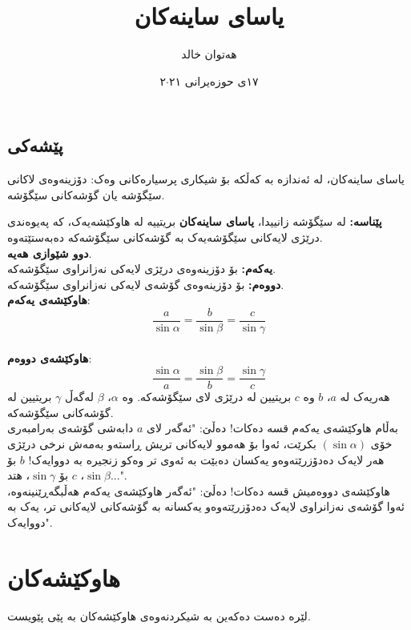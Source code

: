 \documentclass[a4paper,12pt]{article}
\author{هەتوان خالد}
\title{\textbf{یاسای ساینەکان}}
\date{١٧ی حوزەیرانی ٢١$\cdot$٢}
\begin{document}
\tableofcontents
\maketitle
\begin{center}
\begin{flushright}
\section{پێشەکی}
\end{flushright}
یاسای ساینەکان، لە ئەندازە بە کەڵکە بۆ شیکاری پرسیارەکانی وەک: دۆزینەوەی لاکانی سێگۆشە یان گۆشەکانی سێگۆشە.
\end{center}
\textbf{پێناسە:} لە سێگۆشە زانییدا، \textbf{یاسای ساینەکان} بریتییە لە هاوکێشەیەک، کە پەیوەندی درێژی لایەکانی سێگۆشەیەک بە گۆشەکانی سێگۆشەکە دەبەستێتەوە.\\

\textbf{{\large دوو شێوازی هەیە}}.\\

\textbf{یەکەم:} بۆ دۆزینەوەی درێژی لایەکی نەزانراوی سێگۆشەکە.\\

\textbf{دووەم:} بۆ دۆزینەوەی گۆشەی لایەکی نەزانراوی سێگۆشەکە.\\


\textbf{هاوکێشەی یەکەم}:$$\frac{a}{\sin \alpha}=\frac{b}{\sin \beta}=\frac{c}{\sin \gamma}$$\\


\textbf{هاوکێشەی دووەم}:$$\frac{\sin \alpha}{a}=\frac{\sin \beta}{b}=\frac{\sin \gamma}{c}$$
 هەریەک لە $a$، $b$ وە $c$ بریتیین لە درێژی لای سێگۆشەکە. وە $\alpha$، $\beta$ لەگەڵ $\gamma$ بریتیین لە گۆشەکانی
 سێگۆشەکە.\\
 
 
 بەڵام هاوکێشەی یەکەم قسە دەکات! دەڵێ: "ئەگەر لای $a$ دابەشی گۆشەی بەرامبەری خۆی $(\sin \alpha)$ بکرێت، ئەوا بۆ هەموو لایەکانی تریش ڕاستەو بەمەش نرخی درێژی هەر لایەک  دەدۆزرێتەوەو یەکسان دەبێت بە ئەوی تر وەکو زنجیرە بە دووایەک! $b$ بۆ $\sin \beta$، $c$ بۆ $\sin \gamma$، هتد...".\\
هاوکێشەی دووەمیش قسە دەکات! دەڵێ: "ئەگەر هاوکێشەی یەکەم هەڵبگەڕێنینەوە، ئەوا گۆشەی نەزانراوی لایەک دەدۆزرێتەوەو یەکسانە بە گۆشەکانی لایەکانی تر، یەک بە دووایەک".
\section{هاوکێشەکان}
لێرە دەست دەکەین بە شیکردنەوەی هاوکێشەکان بە پێی پێویست.
\end{document}
